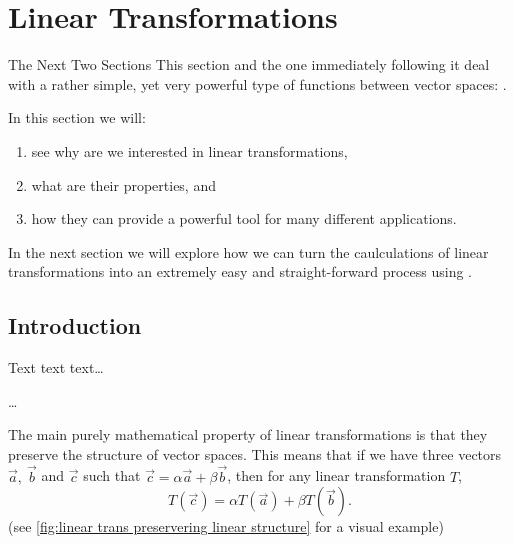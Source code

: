\section{Linear Transformations}
\begin{summary}{The Next Two Sections}{}
	This section and the one immediately following it deal with a rather simple, yet very powerful type of functions between vector spaces: .

	In this section we will:
	\begin{enumerate}
		\item see why are we interested in linear transformations,
		\item what are their properties, and
		\item how they can provide a powerful tool for many different applications.
	\end{enumerate}

	In the next section we will explore how we can turn the caulculations of linear transformations into an extremely easy and straight-forward process using .
\end{summary}

\subsection{Introduction}
Text text text\dots

\dots

The main purely mathematical property of linear transformations is that they preserve the structure of vector spaces. This means that if we have three vectors $\vec{a},\ \vec{b}$ and $\vec{c}$ such that $\vec{c}=\alpha\vec{a}+\beta\vec{b}$, then for any linear transformation $T$,
\begin{equation}
	T(\vec{c}) = \alpha T(\vec{a}) + \beta T(\vec{b}).
	\label{eq:}
\end{equation}
(see \autoref{fig:linear trans preservering linear structure} for a visual example)

